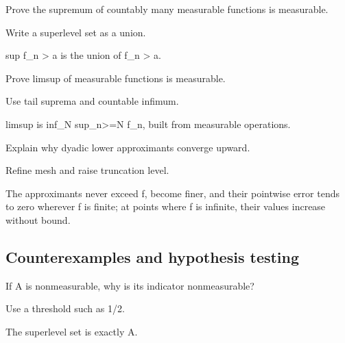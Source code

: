 \begin{exercise}[Supremum]\label{exr:iii02-expand-07}
Prove the supremum of countably many measurable functions is measurable.
\end{exercise}
\begin{hint}
Write a superlevel set as a union.
\end{hint}
\begin{solution}
{sup f\_n > a} is the union of {f\_n > a}.
\end{solution}

\begin{exercise}[Limsup]\label{exr:iii02-expand-08}
Prove limsup of measurable functions is measurable.
\end{exercise}
\begin{hint}
Use tail suprema and countable infimum.
\end{hint}
\begin{solution}
limsup is inf\_N sup\_{n>=N} f\_n, built from measurable operations.
\end{solution}

\begin{exercise}\label{exr:iii02-expand-09}
Explain why dyadic lower approximants converge upward.
\end{exercise}
\begin{hint}
Refine mesh and raise truncation level.
\end{hint}
\begin{solution}
The approximants never exceed f, become finer, and their pointwise error tends to zero wherever f is finite; at points where f is infinite, their values increase without bound.
\end{solution}

\subsection*{Counterexamples and hypothesis testing}

\begin{exercise}\label{exr:iii02-expand-10}
If A is nonmeasurable, why is its indicator nonmeasurable?
\end{exercise}
\begin{hint}
Use a threshold such as 1/2.
\end{hint}
\begin{solution}
The superlevel set is exactly A.
\end{solution}

